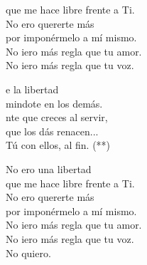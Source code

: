 \begin{cancion}
\begin{chorus}
	\jump
	que me hace libre frente a Ti.\\
		No ero quererte más\\
	\jump
	por imponérmelo a mí mismo.\\
		No iero más regla que tu amor.\\
		No iero más regla que tu voz.\jump\\
	\end{chorus}%
	e la libertad\\
	mindote en los demás.\\
	nte que creces al servir,\\
	que los dás renacen... \\
Tú con ellos, al fin. (**)\jump\\
	\begin{chorus}%
		No ero una libertad \\
	\jump
	que me hace libre frente a Ti.\\
		No ero quererte más\\
	\jump
	por imponérmelo a mí mismo.\\
		No iero más regla que tu amor.\\
		No iero más regla que tu voz.\\
		No quiero.\jump\\
	\end{chorus}%
\end{cancion}%

